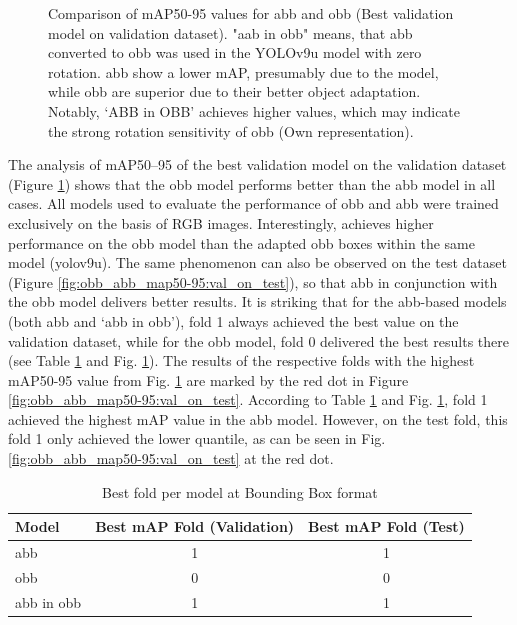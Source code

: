 \begin{figure}[htbp]
    \centering
    
    \caption[Comparison of \acrshort{mAP}50-95 values for \acrshort{abb} and \acrshort{obb} (Best validation model on validation dataset)]{Comparison of \acrshort{mAP}50-95 values for \acrshort{abb} and \acrshort{obb} (Best validation model on validation dataset). "aab in obb" means, that \acrlong{abb} converted to obb was used in the \acrshort{YOLO}v9u model with zero rotation. \acrshort{abb} show a lower \acrshort{mAP}, presumably due to the model, while \acrshort{obb} are superior due to their better object adaptation. Notably, ‘ABB in OBB’ achieves higher values, which may indicate the strong rotation sensitivity of \acrshort{obb} (Own representation).}
    \label{fig:obb_abb_map50-95:val_on_val}
\end{figure}
The analysis of \acrshort{mAP}50--95 of the best validation model on the validation dataset (Figure \ref{fig:obb_abb_map50-95:val_on_val}) shows that the \acrshort{obb} model performs better than the \acrshort{abb} model in all cases. All models used to evaluate the performance of \acrshort{obb} and \acrshort{abb} were trained exclusively on the basis of \acrshort{RGB} images. Interestingly,  achieves higher performance on the \acrshort{obb} model than the adapted \acrshort{obb} boxes within the same model (yolov9u). The same phenomenon can also be observed on the test dataset (Figure \ref{fig:obb_abb_map50-95:val_on_test}), so that \acrshort{abb} in conjunction with the \acrshort{obb} model delivers better results. It is striking that for the \acrshort{abb}-based models (both \acrshort{abb} and ‘abb in obb’), fold 1 always achieved the best value on the validation dataset, while for the \acrshort{obb} model, fold 0 delivered the best results there (see Table \ref{tab:best_folds_area} and Fig. \ref{fig:obb_abb_map50-95:val_on_val}). The results of the respective folds with the highest \acrshort{mAP}50-95 value from Fig. \ref{fig:obb_abb_map50-95:val_on_val} are marked by the red dot in Figure \ref{fig:obb_abb_map50-95:val_on_test}. According to Table \ref{tab:best_folds_area} and Fig. \ref{fig:obb_abb_map50-95:val_on_val}, fold 1 achieved the highest \acrshort{mAP} value in the \acrshort{abb} model. However, on the test fold, this fold 1 only achieved the lower quantile, as can be seen in Fig. \ref{fig:obb_abb_map50-95:val_on_test} at the red dot.


\begin{table}[h]
\centering
\begin{tabular}{l c c}
\hline
\textbf{Model} & \textbf{Best mAP Fold (Validation)} & \textbf{Best mAP Fold (Test)} \\ 
\hline
abb &  1 & 1 \\
obb &  0 & 0 \\
abb in obb &  1 & 1 \\
\hline
\end{tabular}
\caption{Best fold per model at Bounding Box format}
\label{tab:best_folds_area}
\end{table}


